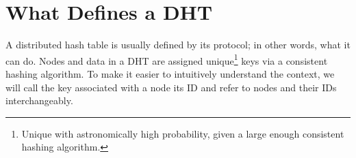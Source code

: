 %	
%	
%	


\section{What Defines a DHT}
\label{sec:define}

A distributed hash table is usually defined by its protocol; in other words, what it can do.
Nodes and data in a DHT are assigned unique\footnote{Unique with astronomically high probability, given a large enough consistent hashing algorithm.} keys via a consistent hashing algorithm.
To make it easier to intuitively understand the context, we will call the key associated with a node its ID and refer to nodes and their IDs interchangeably.

